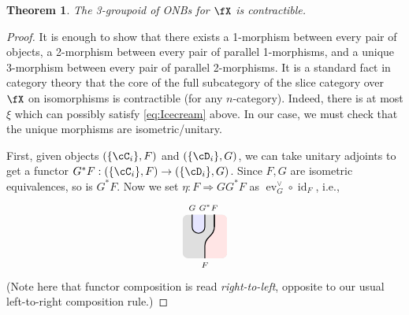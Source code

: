 \documentclass[12pt, reqno]{amsart}
\newcommand{\tikzmath}[2][]
{\vcenter{\hbox{\begin{tikzpicture}[#1]#2\end{tikzpicture}}}
}
\newcommand{\AColor}{lightgray!50}
\newcommand{\Asplitcolor}{red!10}
\newcommand{\ccol}{blue!10}
\DeclareMathOperator{\ev}{ev}
\DeclareMathOperator{\id}{id}
\theoremstyle{plain}
\newtheorem{thm}{Theorem}[section]
\theoremstyle{definition}
\begin{document}
\begin{thm}\label{spaceofONBscontractible}
The 3-groupoid of ONBs for $\fX$ is contractible.
\end{thm}
\begin{proof}
It is enough to show that there exists a 1-morphism between every pair of objects, 
a 2-morphism between every pair of parallel 1-morphisms, 
and a unique 3-morphism between every pair of parallel 2-morphisms.
It is a standard fact in category theory that the core of the full subcategory of the slice category over $\fX$ on isomorphisms is contractible (for any $n$-category).
Indeed, there is at most $\xi$ which can possibly satisfy \eqref{eq:Icecream} above.
In our case, we must check that the unique morphisms are isometric/unitary.

First, given objects $(\{\cC_i\},F)$ and $(\{\cD_i\},G)$, we can take unitary adjoints to get a functor $G^*F: (\{\cC_i\},F)\to (\{\cD_i\},G)$.
Since $F,G$ are isometric equivalences, so is $G^*F$.
Now we set $\eta: F\Rightarrow GG^*F$ as $\ev_G^\vee\circ \id_F$, i.e.,
$$
\tikzmath{
\begin{scope}
\clip [rounded corners=5] (-.7,-.7) rectangle (.7,.7);
\fill[\AColor] (-.7,-.7) rectangle (.7,.7);
\fill[\Asplitcolor] (.7,.7) -- (.3,.7) -- (.3,.3) .. controls ++(0,-.3) and ++(0,.3) .. (0,-.3) -- (0,-.7) -- (.7,-.7);
\fill[\ccol] (-.4,.7) -- (-.4,.3) arc(180:360:.2) -- (0,.3) -- (0,.7);
\end{scope}
\draw[thick] (-.4,.7) node[above] {$\scriptstyle G$} -- (-.4,.3) arc(180:360:.2) -- (0,.3) -- (0,.7) node[above] {$\scriptstyle G^*$};
\draw[thick] (.3,.3) -- (.3,.7) node[above] {$\scriptstyle F$};
\draw[thick] (.3,.7) -- (.3,.3) .. controls ++(0,-.3) and ++(0,.3) .. (0,-.3) -- (0,-.7) node[below] {$\scriptstyle F$};
}
$$
(Note here that functor composition is read \emph{right-to-left}, opposite to our usual left-to-right composition rule.)


\end{proof}
\end{document}
